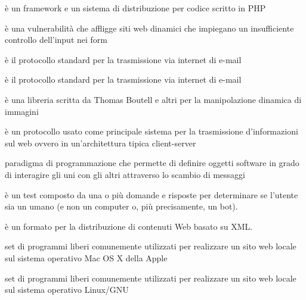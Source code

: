 \begin{acronym}
{\small è un framework e un sistema di distribuzione per codice scritto in PHP \par}
%

{\small è una vulnerabilità che affligge siti web dinamici che impiegano un insufficiente controllo dell'input nei form \par}
%

{\small è il protocollo standard per la trasmissione via internet di e-mail \par}
%

{\small è il protocollo standard per la trasmissione via internet di e-mail \par}
%

{\small è una libreria scritta da Thomas Boutell e altri per la manipolazione dinamica di immagini \par}
%

{\small è un protocollo usato come principale sistema per la trasmissione d'informazioni sul web ovvero in un'architettura tipica client-server \par}
%

{\small paradigma di programmazione che permette di definire oggetti software in grado di interagire gli uni con gli altri attraverso lo scambio di messaggi \par}
%

{\small è un test composto da una o più domande e risposte per determinare se l'utente sia un umano (e non un computer o, più precisamente, un bot). \par}
%

{\small è un formato per la distribuzione di contenuti Web basato su XML. \par}
%

{\small set di programmi liberi comunemente utilizzati per realizzare un sito web locale sul sistema operativo Mac OS X della Apple \par}
%

{\small set di programmi liberi comunemente utilizzati per realizzare un sito web locale sul sistema operativo Linux/GNU \par}
%


\end{acronym}

